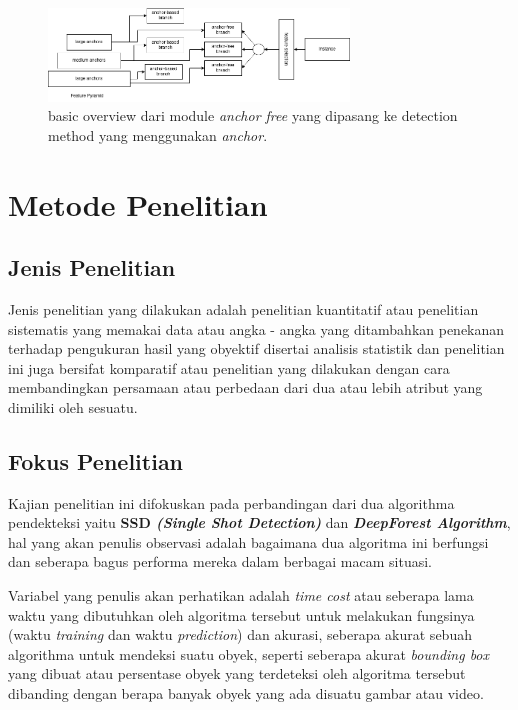 \documentclass[a4paper]{article}
\begin{document}
\begin{enumerate}
    \begin{figure}[h]
        \includegraphics[width=8cm]{basic_overview_FSAF.png}
        \centering
    
        \caption{basic overview dari module \textit{anchor free} yang dipasang ke detection method yang menggunakan \textit{anchor}\autocite{Zhu_2019_CVPR}.}
    \end{figure}
\end{enumerate}

\newpage
\section*{Metode Penelitian}

\subsection*{Jenis Penelitian}
Jenis penelitian yang dilakukan adalah penelitian kuantitatif atau penelitian sistematis yang memakai data atau angka - angka yang ditambahkan penekanan terhadap pengukuran hasil yang obyektif disertai analisis statistik\autocite{pengajar-1} dan penelitian ini juga bersifat komparatif atau penelitian yang dilakukan dengan cara membandingkan persamaan atau perbedaan dari dua atau lebih atribut yang dimiliki oleh sesuatu\autocite{penerbitdeepublish-1}.

\subsection*{Fokus Penelitian}
Kajian penelitian ini difokuskan pada perbandingan dari dua algorithma pendekteksi yaitu \textbf{SSD \textit{(Single Shot Detection)}} dan \textbf{\textit{DeepForest Algorithm}}, hal yang akan penulis observasi adalah bagaimana dua algoritma ini berfungsi dan seberapa bagus performa mereka dalam berbagai macam situasi.

Variabel yang penulis akan perhatikan adalah \textit{time cost} atau seberapa lama waktu yang dibutuhkan oleh algoritma tersebut untuk melakukan fungsinya (waktu \textit{training} dan waktu \textit{prediction}) dan akurasi, seberapa akurat sebuah algorithma untuk mendeksi suatu obyek, seperti seberapa akurat \textit{bounding box} yang dibuat atau persentase obyek yang terdeteksi oleh algoritma tersebut dibanding dengan berapa banyak obyek yang ada disuatu gambar atau video.
\end{document}
